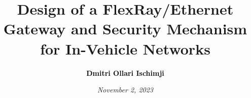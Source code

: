 \author[Dmitri Ollari Ischimji]{\textcolor{black}{\bfseries Dmitri Ollari Ischimji}}
\title{\large Design of a FlexRay/Ethernet Gateway and Security Mechanism for In-Vehicle Networks}
\newcommand{\myDate}{November 2, 2023}

\date{\vspace{-25mm}\scriptsize{\textit{\myDate}}}

